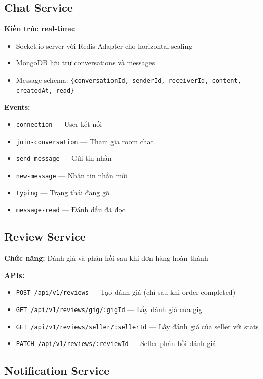 \documentclass[12pt]{extreport}
\begin{document}
\subsection{Chat Service}

\textbf{Kiến trúc real-time:}
\begin{itemize}
    \item Socket.io server với Redis Adapter cho horizontal scaling
    \item MongoDB lưu trữ conversations và messages
    \item Message schema: \texttt{\{conversationId, senderId, receiverId, content, createdAt, read\}}
\end{itemize}

\textbf{Events:}
\begin{itemize}
    \item \texttt{connection} --- User kết nối
    \item \texttt{join-conversation} --- Tham gia room chat
    \item \texttt{send-message} --- Gửi tin nhắn
    \item \texttt{new-message} --- Nhận tin nhắn mới
    \item \texttt{typing} --- Trạng thái đang gõ
    \item \texttt{message-read} --- Đánh dấu đã đọc
\end{itemize}

\subsection{Review Service}

\textbf{Chức năng:} Đánh giá và phản hồi sau khi đơn hàng hoàn thành

\textbf{APIs:}
\begin{itemize}
    \item \texttt{POST /api/v1/reviews} --- Tạo đánh giá (chỉ sau khi order completed)
    \item \texttt{GET /api/v1/reviews/gig/:gigId} --- Lấy đánh giá của gig
    \item \texttt{GET /api/v1/reviews/seller/:sellerId} --- Lấy đánh giá của seller với stats
    \item \texttt{PATCH /api/v1/reviews/:reviewId} --- Seller phản hồi đánh giá
\end{itemize}

\subsection{Notification Service}
\end{document}

